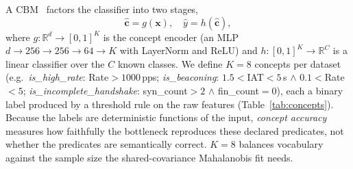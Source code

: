 \documentclass[journal]{IEEEtran}
\begin{document}
A CBM~\cite{koh2020concept} factors the classifier into two stages,
\begin{equation}
  \hat{\mathbf{c}} = g(\mathbf{x}),
  \quad\hat{y} = h(\hat{\mathbf{c}}),
\end{equation}
where $g:\mathbb{R}^d\to[0,1]^K$ is the concept encoder (an MLP $d{\to}256{\to}256{\to}64{\to}K$ with LayerNorm and ReLU) and $h:[0,1]^K\to\mathbb{R}^C$ is a linear classifier over the $C$ known classes. We define $K{=}8$ concepts per dataset (e.g.\ \textit{is\_high\_rate}: Rate${>}1000$\,pps; \textit{is\_beaconing}: $1.5{<}$IAT${<}5$\,s $\wedge$ $0.1{<}$Rate${<}5$; \textit{is\_incomplete\_handshake}: syn\_count${>}2$ $\wedge$ fin\_count${=}0$), each a binary label produced by a threshold rule on the raw features (Table~\ref{tab:concepts}). Because the labels are deterministic functions of the input, \emph{concept accuracy} measures how faithfully the bottleneck reproduces these declared predicates, not whether the predicates are semantically correct. $K{=}8$ balances vocabulary against the sample size the shared-covariance Mahalanobis fit needs.
\end{document}
